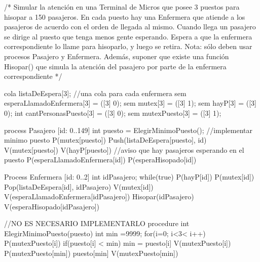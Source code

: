 /* Simular la atención en una Terminal de Micros que posee 3 puestos para hisopar a
150 pasajeros. En cada puesto hay una Enfermera que atiende a los pasajeros de acuerdo
con el orden de llegada al mismo. Cuando llega un pasajero se dirige al puesto que tenga
menos gente esperando. Espera a que la enfermera correspondiente lo llame para
hisoparlo, y luego se retira.
Nota: sólo deben usar procesos Pasajero y Enfermera.
Además, suponer que existe una función Hisopar() que simula la atención del pasajero por
parte de la enfermera correspondiente */

cola listaDeEspera[3]; //una cola para cada enfermera
sem esperaLlamadoEnfermera[3] = ([3] 0);
sem mutex[3] = ([3] 1);
sem hayP[3] = ([3] 0);
int cantPersonasPuesto[3] = ([3] 0);
sem mutexPuesto[3] = ([3] 1);


process Pasajero [id: 0..149]
{
    int puesto = ElegirMinimoPuesto(); //implementar minimo puesto
    P(mutex[puesto])
    Push(listaDeEspera[puesto], id)
    V(mutex[puesto])
    V(hayP[puesto]) //aviso que hay pasajeros esperando en el puesto
    P(esperaLlamadoEnfermera[id])
    P(esperaHisopado[id])
}

Process Enfermera [id: 0..2]
{
    int idPasajero;
    while(true)
    {
        P(hayP[id])
        P(mutex[id])
        Pop(listaDeEspera[id], idPasajero)
        V(mutex[id])
        V(esperaLlamadoEnfermera[idPasajero])
        Hisopar(idPasajero)
        V(esperaHisopado[idPasajero])
    }
}

//NO ES NECESARIO IMPLEMENTARLO
procedure int ElegirMinimoPuesto(puesto)
{
    int min =9999;
    for(i=0; i<3< i++){
        P(mutexPuesto[i])
        if(puesto[i] < min){
            min = puesto[i]
        }
        V(mutexPuesto[i])
    }
    P(mutexPuesto[min])
    puesto[min]
    V(mutexPuesto[min])
}